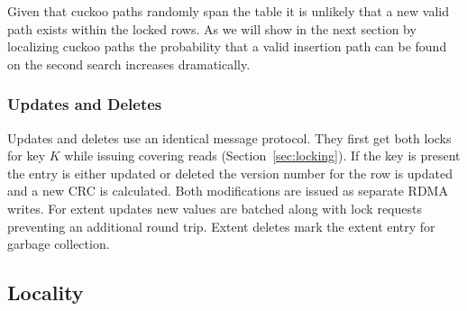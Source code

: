 
Given that cuckoo paths randomly span the table it is
unlikely that a new valid path exists within the locked
rows. As we will show in the next section by localizing
cuckoo paths the probability that a valid insertion path can
be found on the second search increases dramatically.











\subsubsection{Updates and Deletes}

Updates and deletes use an identical message protocol. They
first get both locks for key $K$ while issuing covering
reads (Section~\ref{sec:locking}). If the key is present the
entry is either updated or deleted the version number for
the row is updated and a new CRC is calculated. Both
modifications are issued as separate RDMA writes. For extent
updates new values are batched along with lock requests
preventing an additional round trip. Extent deletes mark the
extent entry for garbage collection.


\subsection{Locality}

